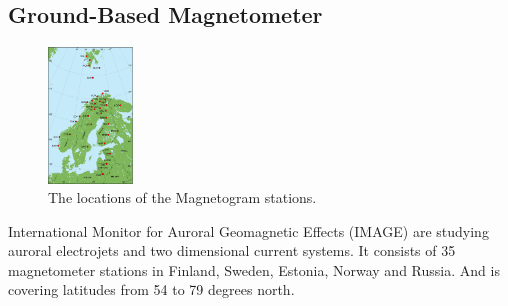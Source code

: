 \subsection{Ground-Based Magnetometer}

\begin{figure} 
\vspace{-30pt}
  \begin{center}
    \includegraphics[width=0.2\textwidth]{Figures/Magnetogram/image_map_2015.jpg}
    \caption{The locations of the Magnetogram stations.}
    \label{fig:magnetogram}
  \end{center}
  \vspace{-30pt}
  \vspace{1pt}
\end{figure}
International Monitor for Auroral Geomagnetic Effects (IMAGE) are studying auroral electrojets and two dimensional current systems. It consists of 35 magnetometer stations in Finland, Sweden, Estonia, Norway and Russia. And is covering latitudes from 54 to 79 degrees north. 




